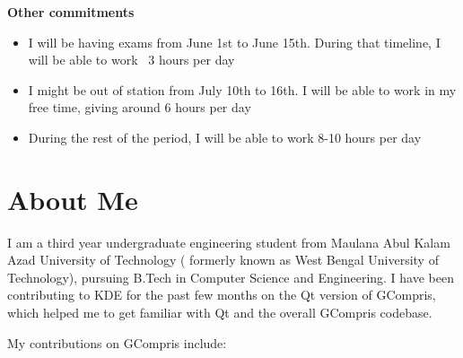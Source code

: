 \documentclass[preprint,12pt]{elsarticle}
\begin{document}
\textbf{Other commitments}

\begin{itemize}
\item I will be having exams from June 1st to June 15th. During that timeline, I will be able to work ~3 hours per day
\item I might be out of station from July 10th to 16th. I will be able to work in my free time, giving around 6 hours per day
\item During the rest of the period, I will be able to work 8-10 hours per day
\end{itemize}

\section{About Me}
\label{S:1}

I am a third year undergraduate engineering student from Maulana Abul Kalam Azad University of Technology ( formerly known as West Bengal University of Technology), pursuing B.Tech in Computer Science and Engineering. I have been contributing to KDE for the past few months on the Qt version of GCompris, which helped me to get familiar with Qt and the overall GCompris codebase.

My contributions on GCompris include:
\end{document}
